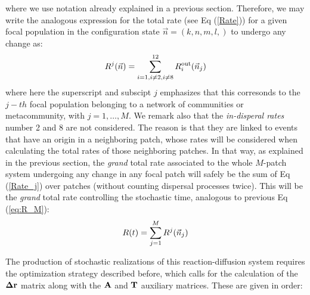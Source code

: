 where we use notation already explained in a previous section. Therefore, we may write the analogous expression for the total rate (see Eq (\ref{Rate})) for a given focal population in the configuration state $\vec{n}=(k,n,m,l,)$ to undergo any change as:
\begin{equation}
R^j(\vec{n}) = \sum_{i=1, i \not= 2, i \not= 8}^{12} R^{\textup{out}}_i(\vec{n}_j)
\label{Rate_j}
\end{equation}
where here the superscript and subscipt $j$ emphasizes that this corresonds to the $j-th$ focal population belonging to a network of communities or metacommunity, with $j=1, \dots, M$. We remark also that the {\em in-disperal rates} number 2 and 8 are not considered. The reason is that they are linked to events that have an origin in a neighboring patch, whose rates will be considered when calculating the total rates of those neighboring patches. In that way, as explained in the previous section, the {\em grand} total rate associated to the whole $M$-patch system undergoing any change in any focal patch will safely be the sum of Eq (\ref{Rate_j}) over patches (without counting dispersal processes twice). This will be the {\em grand} total rate controlling the stochastic time, analogous to previous Eq (\ref{eq:R_M}):
\begin{equation}
  R(t) =  \sum_{j=1}^{M} R^j(\vec{n}_j)\\
  \label{eq:RD_M}
\end{equation}  
 
The production of stochastic realizations of this reaction-diffusion system requires the optimization strategy described before, which calls for the calculation of the ${\bf \Delta r}$ matrix along with the ${\bf A}$ and ${\bf T}$ auxiliary matrices. These are given in order:  

